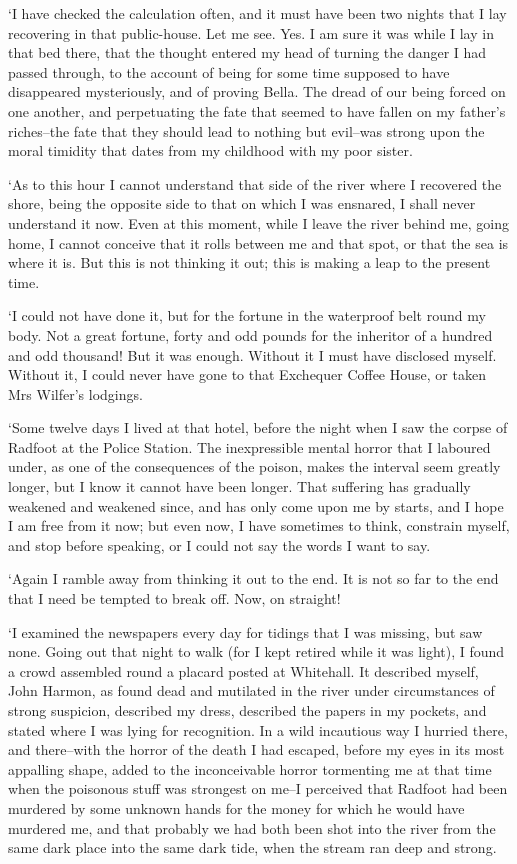 ‘I have checked the calculation often, and it must have been two nights
that I lay recovering in that public-house. Let me see. Yes. I am sure
it was while I lay in that bed there, that the thought entered my head
of turning the danger I had passed through, to the account of being
for some time supposed to have disappeared mysteriously, and of proving
Bella. The dread of our being forced on one another, and perpetuating
the fate that seemed to have fallen on my father’s riches--the fate that
they should lead to nothing but evil--was strong upon the moral timidity
that dates from my childhood with my poor sister.

‘As to this hour I cannot understand that side of the river where I
recovered the shore, being the opposite side to that on which I was
ensnared, I shall never understand it now. Even at this moment, while I
leave the river behind me, going home, I cannot conceive that it rolls
between me and that spot, or that the sea is where it is. But this is
not thinking it out; this is making a leap to the present time.

‘I could not have done it, but for the fortune in the waterproof
belt round my body. Not a great fortune, forty and odd pounds for the
inheritor of a hundred and odd thousand! But it was enough. Without it I
must have disclosed myself. Without it, I could never have gone to that
Exchequer Coffee House, or taken Mrs Wilfer’s lodgings.

‘Some twelve days I lived at that hotel, before the night when I saw the
corpse of Radfoot at the Police Station. The inexpressible mental horror
that I laboured under, as one of the consequences of the poison, makes
the interval seem greatly longer, but I know it cannot have been longer.
That suffering has gradually weakened and weakened since, and has only
come upon me by starts, and I hope I am free from it now; but even now,
I have sometimes to think, constrain myself, and stop before speaking,
or I could not say the words I want to say.

‘Again I ramble away from thinking it out to the end. It is not so far
to the end that I need be tempted to break off. Now, on straight!

‘I examined the newspapers every day for tidings that I was missing, but
saw none. Going out that night to walk (for I kept retired while it was
light), I found a crowd assembled round a placard posted at Whitehall.
It described myself, John Harmon, as found dead and mutilated in the
river under circumstances of strong suspicion, described my dress,
described the papers in my pockets, and stated where I was lying for
recognition. In a wild incautious way I hurried there, and there--with
the horror of the death I had escaped, before my eyes in its most
appalling shape, added to the inconceivable horror tormenting me at
that time when the poisonous stuff was strongest on me--I perceived that
Radfoot had been murdered by some unknown hands for the money for which
he would have murdered me, and that probably we had both been shot into
the river from the same dark place into the same dark tide, when the
stream ran deep and strong.

